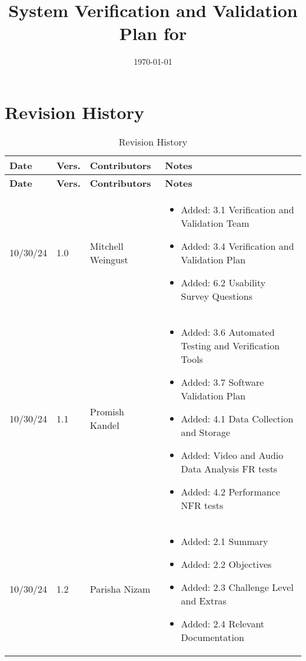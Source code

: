 \documentclass[12pt, titlepage]{article}
\begin{document}
\title{System Verification and Validation Plan for \progname{}} 
\author{\authname}
\date{\today}
	
\maketitle


\section*{Revision History}

\begin{longtable}{p{2cm}p{1cm}p{4cm}p{8cm}}
\caption{Revision History} \label{TblRevisionHistory} \\
\toprule
\textbf{Date} & \textbf{Vers.} & \textbf{Contributors} & \textbf{Notes} \\
\midrule
\endfirsthead

\toprule
\textbf{Date} & \textbf{Vers.} & \textbf{Contributors} & \textbf{Notes} \\
\midrule
\endhead

10/30/24 & 1.0 & Mitchell Weingust &
\begin{itemize}[noitemsep, topsep=0pt]
  \item Added: 3.1 Verification and Validation Team
  \item Added: 3.4 Verification and Validation Plan
  \item Added: 6.2 Usability Survey Questions
\end{itemize} \\

10/30/24 & 1.1 & Promish Kandel &
\begin{itemize}[noitemsep, topsep=0pt]
  \item Added: 3.6 Automated Testing and Verification Tools
  \item Added: 3.7 Software Validation Plan
  \item Added: 4.1 Data Collection and Storage
  \item Added: Video and Audio Data Analysis FR tests
  \item Added: 4.2 Performance NFR tests
\end{itemize} \\

10/30/24 & 1.2 & Parisha Nizam &
\begin{itemize}[noitemsep, topsep=0pt]
  \item Added: 2.1 Summary
  \item Added: 2.2 Objectives
  \item Added: 2.3 Challenge Level and Extras
  \item Added: 2.4 Relevant Documentation
\end{itemize} \\


\end{longtable}
\end{document}
